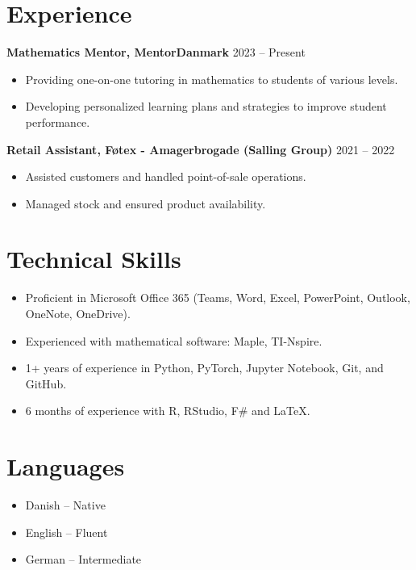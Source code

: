 \documentclass[a4paper,10pt]{article}
\begin{document}
\section*{Experience}
\textbf{Mathematics Mentor, MentorDanmark} \hfill 2023 -- Present 
\begin{itemize}[noitemsep, topsep=0pt]
    \item Providing one-on-one tutoring in mathematics to students of various levels.
    \item Developing personalized learning plans and strategies to improve student performance.
\end{itemize}
\n
\textbf{Retail Assistant, F\o tex - Amagerbrogade (Salling Group)} \hfill 2021 -- 2022 
\begin{itemize}[noitemsep, topsep=0pt]
    \item Assisted customers and handled point-of-sale operations.
    \item Managed stock and ensured product availability.
\end{itemize}
\n
\section*{Technical Skills}
\begin{itemize}[noitemsep, topsep=0pt]
    \item Proficient in Microsoft Office 365 (Teams, Word, Excel, PowerPoint, Outlook, OneNote, OneDrive).
    \item Experienced with mathematical software: Maple, TI-Nspire.
    \item 1+ years of experience in Python, PyTorch, Jupyter Notebook, Git, and GitHub.
    \item 6 months of experience with R, RStudio, F\# and \LaTeX.
\end{itemize}

\section*{Languages}
\begin{itemize}[noitemsep, topsep=0pt]
    \item Danish -- Native
    \item English -- Fluent
    \item German -- Intermediate
\end{itemize}
\end{document}
